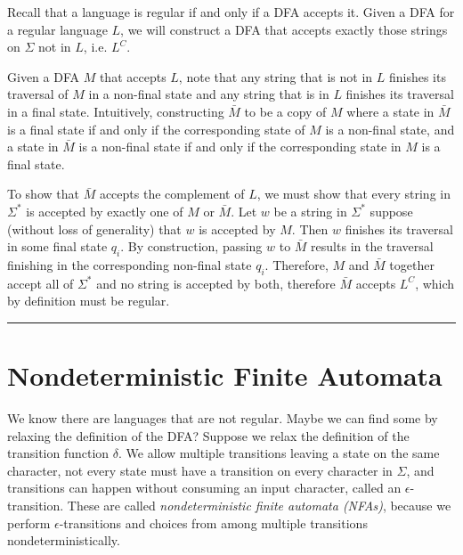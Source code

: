\documentclass[twoside]{article}
\newenvironment{proof}{{\bf Proof:}}{\hfill\rule{2mm}{2mm}}
\begin{document}
\begin{proof}
	
	
	Recall that a language is regular if and only if a DFA accepts it.  Given a DFA for a regular language $L$, we will construct a DFA that accepts exactly those strings on $\Sigma$ not in $L$, i.e. $L^C$.
	
	Given a DFA $M$ that accepts $L$, note that any string that is not in $L$ finishes its traversal of $M$ in a non-final state and any string that is in $L$ finishes its traversal in a final state.  Intuitively, constructing $\bar{M}$ to be a copy of $M$ where a state in $\bar{M}$ is a final state if and only if the corresponding state of $M$ is a non-final state, and a state in $\bar{M}$ is a non-final state if and only if the corresponding state in $M$ is a final state.
	
	To show that $\bar{M}$ accepts the complement of $L$, we must show that every string in $\Sigma^*$ is accepted by exactly one of $M$ or $\bar{M}$.  Let $w$ be a string in $\Sigma^*$  suppose (without loss of generality) that $w$ is accepted by $M$.  Then $w$ finishes its traversal in some final state $q_i$.  By construction, passing $w$ to $\bar{M}$ results in the traversal finishing in the corresponding non-final state $q_i$.  Therefore, $M$ and $\bar{M}$ together accept all of $\Sigma^*$ and no string is accepted by both, therefore $\bar{M}$ accepts $L^C$, which by definition must be regular.
\end{proof}


\section{Nondeterministic Finite Automata}

We know there are languages that are not regular.  Maybe we can find some by relaxing the definition of the DFA?  Suppose we relax the definition of the transition function $\delta$.  We allow multiple transitions leaving a state on the same character, not every state must have a transition on every character in  $\Sigma$, and transitions can happen without consuming an input character, called an $\epsilon$-transition.  These are called \textit{nondeterministic finite automata (NFAs)}, because we perform $\epsilon$-transitions and choices from among multiple transitions nondeterministically.
\end{document}

